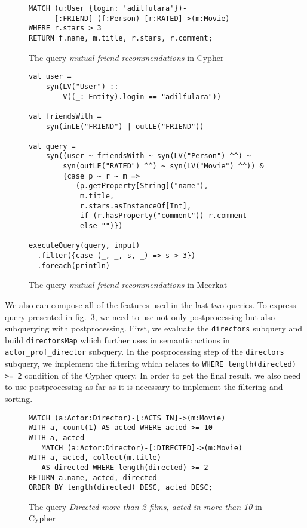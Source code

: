 \begin{figure}[h]
\begin{lstlisting}
MATCH (u:User {login: 'adilfulara'})-
      [:FRIEND]-(f:Person)-[r:RATED]->(m:Movie)
WHERE r.stars > 3
RETURN f.name, m.title, r.stars, r.comment;
\end{lstlisting}
\caption{The query \emph{mutual friend recommendations} in Cypher}
\label{fig:Q4_C}
\end{figure}


\begin{figure}[h]
\begin{lstlisting}
val user = 
    syn(LV("User") :: 
        V((_: Entity).login == "adilfulara"))

val friendsWith = 
    syn(inLE("FRIEND") | outLE("FRIEND"))

val query = 
    syn((user ~ friendsWith ~ syn(LV("Person") ^^) ~
        syn(outLE("RATED") ^^) ~ syn(LV("Movie") ^^)) &
        {case p ~ r ~ m => 
           (p.getProperty[String]("name"), 
            m.title, 
            r.stars.asInstanceOf[Int],
            if (r.hasProperty("comment")) r.comment 
            else "")})
 
executeQuery(query, input)
  .filter({case (_, _, s, _) => s > 3})
  .foreach(println)

\end{lstlisting}
\caption{The query \emph{mutual friend recommendations} in Meerkat}
\label{fig:Q4_M}
\end{figure}

We also can compose all of the features used in the last two queries. 
To express query presented in fig.~\ref{fig:Q3_C}, we need to use not only postprocessing but also subquerying with postprocessing.
First, we evaluate the \lstinline{directors} subquery and build \lstinline{directorsMap} which further uses in semantic actions in \lstinline{actor_prof_director} subquery.
In the posprocessing step of the \lstinline{directors} subquery, we implement the filtering which relates to \lstinline{WHERE length(directed) >= 2} condition of the Cypher query.
In order to get the final result, we also need to use postprocessing as far as it is necessary to implement the filtering and sorting.

\begin{figure}[h]
\begin{lstlisting}
MATCH (a:Actor:Director)-[:ACTS_IN]->(m:Movie)
WITH a, count(1) AS acted WHERE acted >= 10
WITH a, acted 
   MATCH (a:Actor:Director)-[:DIRECTED]->(m:Movie)
WITH a, acted, collect(m.title) 
   AS directed WHERE length(directed) >= 2
RETURN a.name, acted, directed
ORDER BY length(directed) DESC, acted DESC;
\end{lstlisting}
\caption{The query \emph{Directed more than 2 films, acted in more than 10} in Cypher}
\label{fig:Q3_C}
\end{figure}


